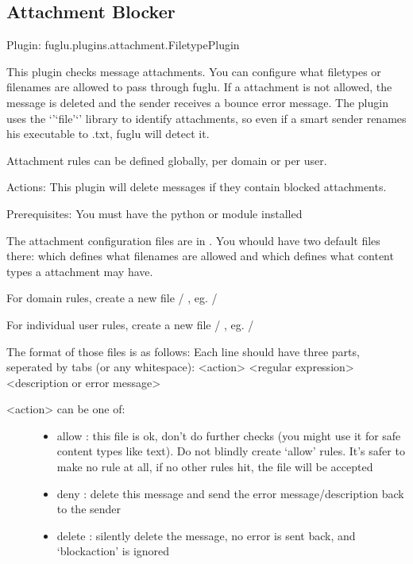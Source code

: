 \documentclass[letterpaper,10pt,english]{sphinxmanual}
\begin{document}
\subsection{Attachment Blocker}
\label{plugins-index:attachment-blocker}
Plugin: fuglu.plugins.attachment.FiletypePlugin

This plugin checks message attachments. You can configure what filetypes or filenames are allowed to pass through fuglu. If a attachment is not allowed, the message is deleted and the sender receives a bounce error message. The plugin uses the `'`file'`' library to identify attachments, so even if a smart sender renames his executable to .txt, fuglu will detect it.

Attachment rules can be defined globally, per domain or per user.

Actions: This plugin will delete messages if they contain blocked attachments.

Prerequisites: You must have the python  or  module installed

The attachment configuration files are in . You whould have two default files there:  which defines what filenames are allowed and  which defines what content types a attachment may have.

For domain rules, create a new file  /  , eg.  / 

For individual user rules, create a new file  / , eg.  / 

The format of those files is as follows: Each line should have three parts, seperated by tabs (or any whitespace):
\textless{}action\textgreater{}    \textless{}regular expression\textgreater{}   \textless{}description or error message\textgreater{}
\begin{description}
\item[{\textless{}action\textgreater{} can be one of:}] \leavevmode\begin{itemize}
\item {} 
allow : this file is ok, don't do further checks (you might use it for safe content types like text). Do not blindly create `allow' rules. It's safer to make no rule at all, if no other rules hit, the file will be accepted

\item {} 
deny : delete this message and send the error message/description back to the sender

\item {} 
delete : silently delete the message, no error is sent back, and `blockaction' is ignored

\end{itemize}

\end{description}
\end{document}
